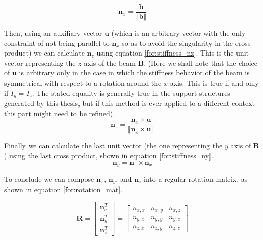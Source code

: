 \begin{equation}
\mathbf{n}_x = \frac{\mathbf{b}}{\Vert{}\mathbf{b}\Vert{}}
\label{for:stiffness_nx}
\end{equation}

\noindent
Then, using an auxiliary vector $\mathbf{u}$ (which is an arbitrary vector with the only constraint of not being 
parallel to $\mathbf{n}_x$ so as to avoid the singularity in the cross product) we can calculate $\mathbf{n}_z$ using equation
\ref{for:stiffness_nz}. This is the unit vector representing the $z$ axis of the beam $\mathbf{B}$.
(Here we shall note that the choice of $\mathbf{u}$ is arbitrary only in the case in which the stiffness behavior of the
beam is symmetrical with respect to a rotation around the $x$ axis. This is true if and only if $I_y = I_z$. The stated equality 
is generally true in the support structures generated by this thesis, but if this
method is ever applied to a different context this part might need to be refined).
\begin{equation}
\mathbf{n}_z = \frac{\mathbf{n}_x \times \mathbf{u}}{\Vert{}\mathbf{n}_x \times \mathbf{u}\Vert{}}
\label{for:stiffness_nz}
\end{equation}

\noindent
Finally we can calculate the last unit vector (the one representing the $y$ axis of $\mathbf{B}$) using the last cross product, shown
in equation \ref{for:stiffness_ny}.
\begin{equation}
\mathbf{n}_y = \mathbf{n}_z \times \mathbf{n}_x
\label{for:stiffness_ny}
\end{equation}

\noindent
To conclude we can compose $\mathbf{n}_x$, $\mathbf{n}_y$, and $\mathbf{n}_z$ into a regular rotation matrix, as shown in equation
\ref{for:rotation_mat}.

\begin{equation}
\mathbf{R} = \begin{bmatrix} \mathbf{n}_x^T \\ \mathbf{n}_y^T \\ \mathbf{n}_z^T \end{bmatrix} = \begin{bmatrix} n_{x,x} & n_{x,y} & n_{x,z} \\ n_{y,x} & n_{y,y} & n_{y,z} \\ n_{z,x} & n_{z,y} & n_{z,z} \end{bmatrix}
\label{for:rotation_mat}
\end{equation}

